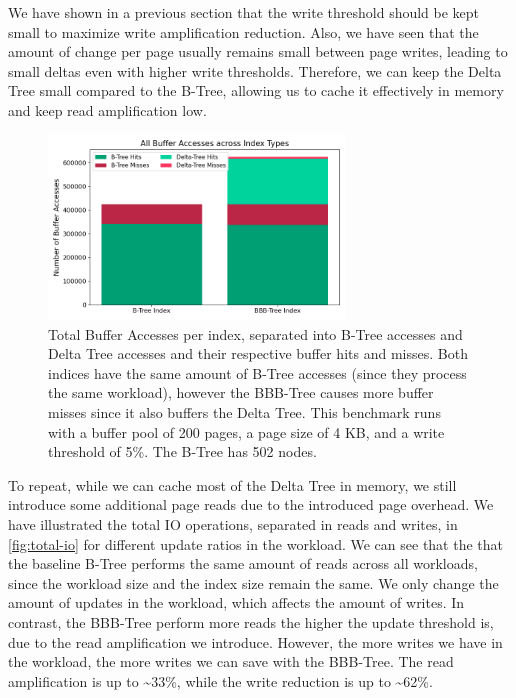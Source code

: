 We have shown in a previous section that the write threshold should be kept small to maximize write amplification reduction.
Also, we have seen that the amount of change per page usually remains small between page writes, leading to small deltas even with higher write thresholds.
Therefore, we can keep the Delta Tree small compared to the B-Tree, allowing us to cache it effectively in memory and keep read amplification low.

\begin{figure}[htbp]
  \centering
  \includegraphics[width=0.7\textwidth]{figures/evaluation/pageviews_buffer_accesses_mixed.png}
  \caption{Total Buffer Accesses per index, separated into B-Tree accesses and Delta Tree accesses and their respective buffer hits and misses. Both indices have the same amount of B-Tree accesses (since they process the same workload), however the BBB-Tree causes more buffer misses since it also buffers the Delta Tree. This benchmark runs with a buffer pool of 200 pages, a page size of 4 KB, and a write threshold of 5\%. The B-Tree has 502 nodes.} 
  \label{fig:buffer-traffic}
\end{figure}

To repeat, while we can cache most of the Delta Tree in memory, we still introduce some additional page reads due to the introduced page overhead.
We have illustrated the total \ac{IO} operations, separated in reads and writes, in \autoref{fig:total-io} for different update ratios in the workload.
We can see that the that the baseline B-Tree performs the same amount of reads across all workloads, since the workload size and the index size remain the same.
We only change the amount of updates in the workload, which affects the amount of writes.
In contrast, the BBB-Tree perform more reads the higher the update threshold is, due to the read amplification we introduce.
However, the more writes we have in the workload, the more writes we can save with the BBB-Tree.
The read amplification is up to \textasciitilde33\%, while the write reduction is up to \textasciitilde62\%.

